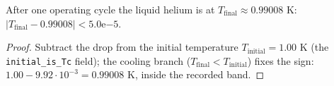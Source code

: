 \begin{theorem}
\label{thm:IPhO2026Problems_problem_IPhO_2026_3_C_3:final_temperature_value}
After one operating cycle the liquid helium is at
$T_{\mathrm{final}} \approx 0.99008$ K:
$|T_{\mathrm{final}} - 0.99008| < 5.0\mathrm{e}{-5}$.
\end{theorem}
\begin{proof}
Subtract the drop from the initial temperature $T_{\mathrm{initial}} = 1.00$ K
(the \texttt{initial\_is\_Tc} field); the cooling branch
($T_{\mathrm{final}} < T_{\mathrm{initial}}$) fixes the sign:
$1.00 - 9.92{\cdot}10^{-3} = 0.99008$ K, inside the recorded band.
\end{proof}

